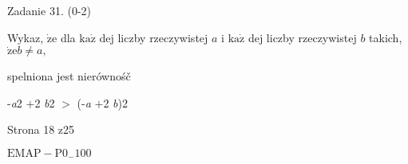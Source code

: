\documentclass[a4paper,12pt]{article}
\begin{document}
Zadanie 31. (0-2)

Wykaz, $\dot{\mathrm{z}}\mathrm{e}$ dla $\mathrm{k}\mathrm{a}\dot{\mathrm{z}}$ dej liczby rzeczywistej $a$ i $\mathrm{k}\mathrm{a}\dot{\mathrm{z}}$ dej liczby rzeczywistej $b$ takich, $\dot{\mathrm{z}}\mathrm{e} b\neq a,$

spelniona jest nierównośč

-{\it a}2 $+$2 {\it b}2 $>$ (-{\it a} $+$2 {\it b})2

Strona 18 z25

$\mathrm{E}\mathrm{M}\mathrm{A}\mathrm{P}-\mathrm{P}0_{-}100$
\end{document}
